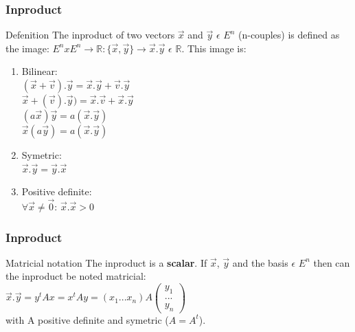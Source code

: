 \begin{frame}
	\frametitle{Inproduct}
	\begin{block}{Defenition}
		The inproduct of two vectors $\overrightarrow{x}$ and $\overrightarrow{y}$ $\epsilon$ $E^n$ (n-couples) is defined as the image: $E^nxE^n\to\mathbb{R}:\{\overrightarrow{x},\overrightarrow{y}\}\to\overrightarrow{x}.\overrightarrow{y}$ $\epsilon$ $\mathbb{R}$. This image is:
		\begin{enumerate}
			\item Bilinear:\\ $(\overrightarrow{x}+\overrightarrow{v}).\overrightarrow{y}=\overrightarrow{x}.\overrightarrow{y}+\overrightarrow{v}.\overrightarrow{y}$\\
			$\overrightarrow{x}+(\overrightarrow{v}).\overrightarrow{y})=\overrightarrow{x}.\overrightarrow{v}+\overrightarrow{x}.\overrightarrow{y}$\\
			$(a\overrightarrow{x})\overrightarrow{y}=a(\overrightarrow{x}.\overrightarrow{y})$\\
			$\overrightarrow{x}(a\overrightarrow{y})=a(\overrightarrow{x}.\overrightarrow{y})$
			\item Symetric:\\
			$\overrightarrow{x}.\overrightarrow{y}=\overrightarrow{y}.\overrightarrow{x}$
			\item Positive definite:\\
			$\forall \overrightarrow{x} \neq \overrightarrow{0}$: $\overrightarrow{x} .\overrightarrow{x} > 0$
		\end{enumerate}
	\end{block}
\end{frame}

\begin{frame}
	\frametitle{Inproduct}
	\begin{block}{Matricial notation}
		The inproduct is a {\bf scalar}. If $\overrightarrow{x}$, $\overrightarrow{y}$ and the basis $\epsilon$ $E^n$ then can the inproduct be noted matricial:\\
		$\overrightarrow{x}.\overrightarrow{y}=y^tAx=x^tAy=(x_1...x_n)A\begin{pmatrix} y_1\\...\\y_n\end{pmatrix}$\\
		with A positive definite and symetric ($A=A^t$).
	\end{block} 
\end{frame}

